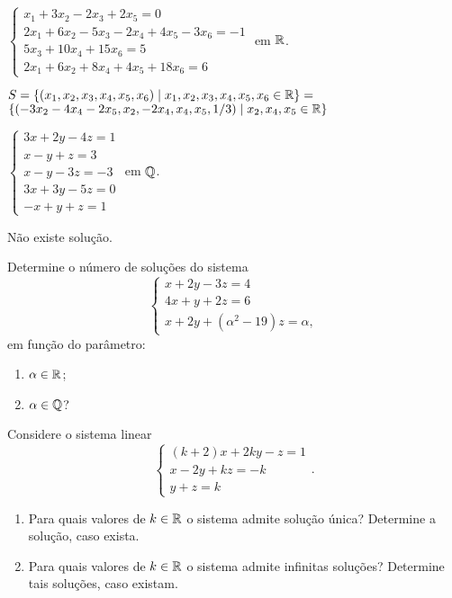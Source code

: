 \documentclass[12pt]{exam}
\begin{document}
\begin{exercicio}
  $
    \begin{cases}
      x_1 + 3x_2 - 2x_3 + 2x_5 = 0\\
      2x_1 + 6x_2 - 5x_3 - 2x_4 + 4x_5 - 3x_6 = -1\\
      5x_3 + 10x_4 + 15x_6 = 5\\
      2x_1 + 6x_2 + 8x_4 + 4x_5 + 18x_6 = 6
    \end{cases}
  $
  em $\mathbb{R}$.
  \begin{solucao}
    $S = \{(x_1, x_2, x_3, x_4, x_5, x_6) \mid x_1, x_2, x_3, x_4, x_5, x_6 \in \mathbb{R}\} = $\\ $\{(-3x_2 - 4x_4 - 2x_5, x_2, -2x_4, x_4, x_5, 1/3) \mid x_2, x_4, x_5 \in \mathbb{R}\}$
  \end{solucao}
\end{exercicio}

\begin{exercicio}\label{sistema_linear_fim_gauss-jordan}
  $
    \begin{cases}
      3x + 2y - 4z = 1\\
      x - y + z = 3\\
      x - y - 3z = -3\\
      3x + 3y - 5z =0\\
      -x + y + z = 1
    \end{cases}
  $
  em $\mathbb{Q}$.
\begin{solucao}
  Não existe solução.
\end{solucao}
\end{exercicio}

\begin{exercicio}
  Determine o número de soluções do sistema
  \[
    \begin{cases}
      x + 2y - 3z = 4\\
      4x + y + 2z = 6\\
      x + 2y + (\alpha^2 - 19)z = \alpha,
    \end{cases}
\]
em função do parâmetro:
\begin{enumerate}[label={\alph*})]
   \item $\alpha \in \mathbb{R}$;
   \item $\alpha \in \mathbb{Q}$?
 \end{enumerate}
\end{exercicio}

\begin{exercicio}
  Considere o sistema linear
  \[
    \begin{cases}
      (k + 2)x + 2ky - z = 1\\
      x - 2y + kz = -k\\
      y + z = k
    \end{cases}.
  \]
  \begin{enumerate}[label={\alph*})]
    \item Para quais valores de $k \in \mathbb{R}$ o sistema admite solução única? Determine a solução, caso exista.
    \item Para quais valores de $k \in \mathbb{R}$ o sistema admite infinitas soluções? Determine tais soluções, caso existam.
  \end{enumerate}
\end{exercicio}
\end{document}
